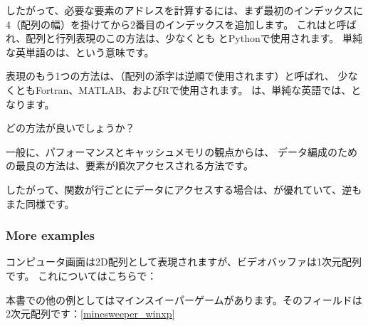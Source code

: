
したがって、必要な要素のアドレスを計算するには、まず最初のインデックスに
4（配列の幅）を掛けてから2番目のインデックスを追加します。
これはと呼ばれ、配列と行列表現のこの方法は、少なくとも \CCpp とPythonで使用されます。
単純な英単語のは、という意味です。

表現のもう1つの方法は、（配列の添字は逆順で使用されます）と呼ばれ、
少なくともFortran、MATLAB、およびRで使用されます。
は、単純な英語では、となります。

どの方法が良いでしょうか？

一般に、パフォーマンスとキャッシュメモリの観点からは、
データ編成のための最良の方法は、要素が順次アクセスされる方法です。

したがって、関数が行ごとにデータにアクセスする場合は、が優れていて、逆もまた同様です。





\subsubsection{More examples}

コンピュータ画面は2D配列として表現されますが、ビデオバッファは1次元配列です。
これについてはこちらで：

本書での他の例としてはマインスイーパーゲームがあります。そのフィールドは2次元配列です：\ref{minesweeper_winxp}
